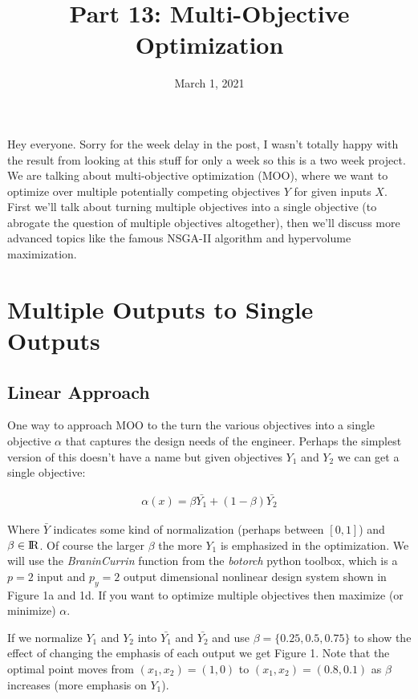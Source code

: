 \documentclass[12pt]{article}
\title{Part 13: Multi-Objective Optimization}
\begin{document}
\date{March 1, 2021}
\maketitle

Hey everyone. Sorry for the week delay in the post, I wasn't totally happy with the result from looking at this stuff for only a week so this is a two week project. We are talking about multi-objective optimization (MOO), where we want to optimize over multiple potentially competing objectives $Y$ for given inputs $X$. First we'll talk about turning multiple objectives into a single objective (to abrogate the question of multiple objectives altogether), then we'll discuss more advanced topics like the famous NSGA-II algorithm and hypervolume maximization. 

\section{Multiple Outputs to Single Outputs}

\subsection{Linear Approach}

One way to approach MOO to the turn the various objectives into a single objective $\alpha$ that captures the design needs of the engineer. Perhaps the simplest version of this doesn't have a name but given objectives $Y_1$ and $Y_2$ we can get a single objective:

\begin{align*}
\alpha(x)=\beta\bar{Y_1}+(1-\beta)\bar{Y_2}
\end{align*}

\vspace{5mm}

Where $\bar{Y}$ indicates some kind of normalization (perhaps between $[0,1]$) and $\beta\in \rm I\!R$. Of course the larger $\beta$ the more $Y_1$ is emphasized in the optimization. We will use the \emph{BraninCurrin} function from the \emph{botorch} python toolbox, which is a $p=2$ input and $p_y=2$ output dimensional nonlinear design system shown in Figure 1a and 1d. If you want to optimize multiple objectives then maximize (or minimize) $\alpha$.

\vspace{5mm}

If we normalize $Y_1$ and $Y_2$ into $\bar{Y_1}$ and $\bar{Y_2}$ and use $\beta=\{0.25,0.5,0.75\}$ to show the effect of changing the emphasis of each output we get Figure 1. Note that the optimal point moves from $(x_1,x_2)=(1,0)$ to $(x_1,x_2)=(0.8,0.1)$ as $\beta$ increases (more emphasis on $Y_1$).
\end{document}

